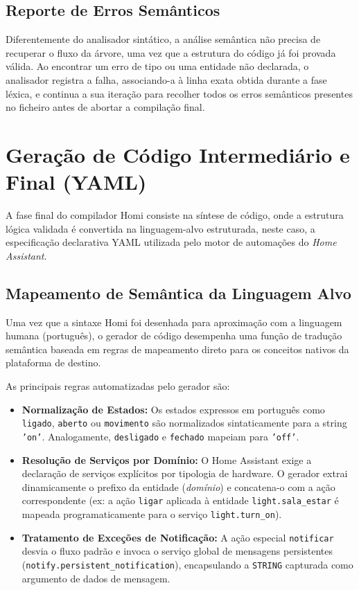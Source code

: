 \documentclass[12pt, a4paper]{article}
\begin{document}
\subsection{Reporte de Erros Semânticos}
Diferentemente do analisador sintático, a análise semântica não precisa de recuperar o fluxo da árvore, uma vez que a estrutura do código já foi provada válida. Ao encontrar um erro de tipo ou uma entidade não declarada, o analisador registra a falha, associando-a à linha exata obtida durante a fase léxica, e continua a sua iteração para recolher todos os erros semânticos presentes no ficheiro antes de abortar a compilação final.

\section{Geração de Código Intermediário e Final (YAML)}
A fase final do compilador Homi consiste na síntese de código, onde a estrutura lógica validada é convertida na linguagem-alvo estruturada, neste caso, a especificação declarativa YAML utilizada pelo motor de automações do \textit{Home Assistant}.

\subsection{Mapeamento de Semântica da Linguagem Alvo}
Uma vez que a sintaxe Homi foi desenhada para aproximação com a linguagem humana (português), o gerador de código desempenha uma função de tradução semântica baseada em regras de mapeamento direto para os conceitos nativos da plataforma de destino.

As principais regras automatizadas pelo gerador são:
\begin{itemize}
    \item \textbf{Normalização de Estados:} Os estados expressos em português como \texttt{ligado}, \texttt{aberto} ou \texttt{movimento} são normalizados sintaticamente para a string \texttt{'on'}. Analogamente, \texttt{desligado} e \texttt{fechado} mapeiam para \texttt{'off'}.
    \item \textbf{Resolução de Serviços por Domínio:} O Home Assistant exige a declaração de serviços explícitos por tipologia de hardware. O gerador extrai dinamicamente o prefixo da entidade (\textit{domínio}) e concatena-o com a ação correspondente (ex: a ação \texttt{ligar} aplicada à entidade \texttt{light.sala\_estar} é mapeada programaticamente para o serviço \texttt{light.turn\_on}).
    \item \textbf{Tratamento de Exceções de Notificação:} A ação especial \texttt{notificar} desvia o fluxo padrão e invoca o serviço global de mensagens persistentes (\texttt{notify.persistent\_notification}), encapsulando a \texttt{STRING} capturada como argumento de dados de mensagem.
\end{itemize}
\end{document}
